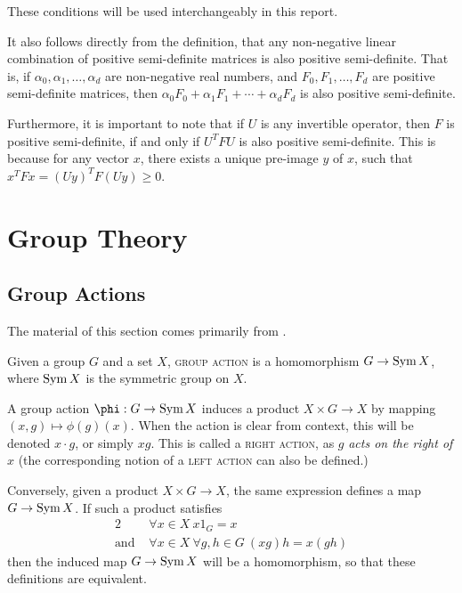 \documentclass{report}
\begin{document}
    These conditions will be used interchangeably in this report.

    It also follows directly from the definition, that any non-negative linear
    combination of positive semi-definite matrices is also positive
    semi-definite.  That is, if $\alpha_0, \alpha_1, \ldots, \alpha_d$ are
    non-negative real numbers, and $F_0, F_1, \ldots, F_d$ are positive
    semi-definite matrices, then $\alpha_0 F_0 + \alpha_1 F_1 + \cdots +
    \alpha_d F_d$ is also positive semi-definite.

    Furthermore, it is important to note that if $U$ is any invertible operator,
    then $F$ is positive semi-definite, if and only if $U^TFU$ is also positive
    semi-definite.  This is because for any vector $x$, there exists a unique
    pre-image $y$ of $x$, such that $x^T F x = (Uy)^T F (Uy) \geq 0$.

\chapter{Group Theory}
  \section{Group Actions}
    The material of this section comes primarily from \cite[Section~1.7;
    Chapter~4]{dummit-foote}.

    \begin{defn}\label{group-action}
      Given a group $G$ and a set $X$,
      \textsc{group action} is a homomorphism $G \to \operatorname{Sym} X$,
      where $\operatorname{Sym} X$ is the symmetric group on $X$.
    \end{defn}

    A group action $\phi: G \to \Sym X$ induces a product
    $X \times G \to X$ by mapping $(x, g) \mapsto \phi(g)(x)$.
    When the action is clear from context,
    this will be denoted $x \cdot g$, or simply $xg$.
    This is called a \textsc{right action},
    as $g$ \textit{acts on the right of} $x$
    (the corresponding notion of a \textsc{left action}
    can also be defined.)

    Conversely, given a product $X \times G \to X$,
    the same expression defines a map $G \to \operatorname{Sym} X$.
    If such a product satisfies
    \begin{alignat*}{2}
      &\forall x \in X\ x 1_G = x \\
      \text{and } &\forall x \in X\ \forall g, h \in G\
        (x g) h = x(gh)
    \end{alignat*}
    then the induced map $G \to \operatorname{Sym} X$ will be a homomorphism,
    so that these definitions are equivalent.
\end{document}

